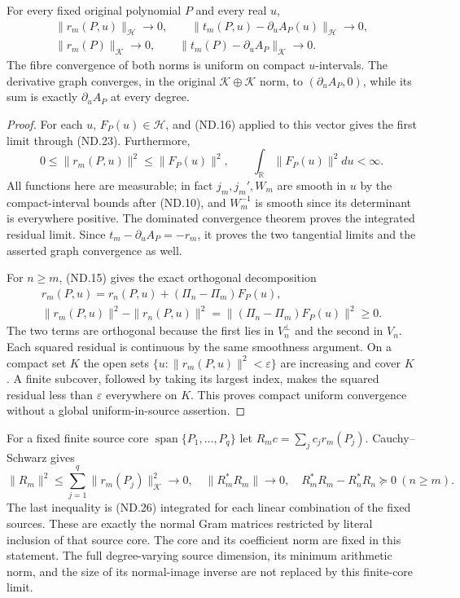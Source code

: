 \begin{theorem}
For every fixed original polynomial \(P\) and every real \(u\),
\[
 \begin{gathered}
 \|r_m(P,u)\|_{\mathscr H}\longrightarrow0,\qquad
 \|t_m(P,u)-\partial_uA_P(u)\|_{\mathscr H}\longrightarrow0,\\
 \|r_m(P)\|_{\mathscr K}\longrightarrow0,\qquad
 \|t_m(P)-\partial_uA_P\|_{\mathscr K}\longrightarrow0.
 \end{gathered}
 \tag{ND.24}
\]
The fibre convergence of both norms is uniform on compact
\(u\)-intervals. The derivative graph converges, in the original
\(\mathscr K\oplus\mathscr K\) norm, to
\((\partial_uA_P,0)\), while its sum is exactly \(\partial_uA_P\)
at every degree.
\end{theorem}

\begin{proof}
For each \(u\), \(F_P(u)\in\mathscr H\), and (ND.16)
applied to this vector gives the first limit through (ND.23).
Furthermore,
\[
 0\le\|r_m(P,u)\|^2\le\|F_P(u)\|^2,
 \qquad \int_{\mathbb R}\|F_P(u)\|^2du<\infty.
 \tag{ND.25}
\]
All functions here are measurable; in fact \(j_m,j_m',W_m\) are
smooth in \(u\) by the compact-interval bounds after (ND.10),
and \(W_m^{-1}\) is smooth since its determinant is everywhere
positive. The dominated convergence theorem proves the integrated
residual limit. Since \(t_m-\partial_uA_P=-r_m\), it proves
the two tangential limits and the asserted graph convergence as well.

For \(n\ge m\), (ND.15) gives the exact orthogonal decomposition
\[
 \begin{gathered}
 r_m(P,u)=r_n(P,u)+(\Pi_n-\Pi_m)F_P(u),\\
 \|r_m(P,u)\|^2-\|r_n(P,u)\|^2
              =\|(\Pi_n-\Pi_m)F_P(u)\|^2\ge0.
 \end{gathered}
 \tag{ND.26}
\]
The two terms are orthogonal because the first lies in \(V_n^\perp\)
and the second in \(V_n\). Each squared residual is continuous
by the same smoothness argument. On a compact set \(K\) the open
sets \(\{u:\|r_m(P,u)\|^2<\varepsilon\}\) are increasing and
cover \(K\). A finite subcover, followed by taking its largest
index, makes the squared residual less than \(\varepsilon\)
everywhere on \(K\). This proves compact uniform convergence
without a global uniform-in-source assertion.
\end{proof}

For a fixed finite source core \(\operatorname{span}\{P_1,\ldots,P_q\}\)
let \(R_m c=\sum_j c_jr_m(P_j)\). Cauchy--Schwarz gives
\[
 \|R_m\|^2\le\sum_{j=1}^q\|r_m(P_j)\|_{\mathscr K}^2\to0,
 \quad \|R_m^*R_m\|\to0,\quad
 R_m^*R_m-R_n^*R_n\succeq0\ (n\ge m).
 \tag{ND.27}
\]
The last inequality is (ND.26) integrated for each linear combination
of the fixed sources. These are exactly the normal Gram matrices
restricted by literal inclusion of that source core. The core and its
coefficient norm are fixed in this statement. The full degree-varying
source dimension, its minimum arithmetic norm, and the size of its
normal-image inverse are not replaced by this finite-core limit.

